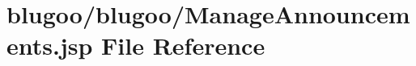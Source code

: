 \hypertarget{ManageAnnouncements_8jsp}{
\section{blugoo/blugoo/ManageAnnouncements.jsp File Reference}
\label{ManageAnnouncements_8jsp}
}



